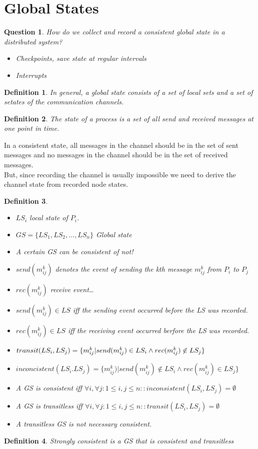 \documentclass[a4paper]{article}
\newtheorem{definition}{Definition}
\newtheorem{question}{Question}
\begin{document}
\section{Global States}
\begin{question}How do we collect and record a consistent global state in a distributed
system?\\
\begin{itemize}
	\item Checkpoints, save state at regular intervals
	\item Interrupts
\end{itemize}
\end{question}
\begin{definition}
	In general, a global state consists of a set of local sets and a set of
	setates of the communication channels.
\end{definition}
\begin{definition}
	The state of a process is a set of all send and received messages at one
	point in time.
\end{definition}
In a consistent state, all messages in the channel should be in the set of sent
messages and no messages in the channel should be in the set of received
messages.\\
But, since recording the channel is usually impossible we need to derive the
channel state from recorded node states.\\
\begin{definition}
	\begin{itemize}
		\item $LS_i$ local state of $P_i$. 
		\item $GS = \{LS_1,LS_2,\dots,LS_n\}$ Global state
		\item A certain GS can be consistent of not!
		\item $send(m^k_{ij})$ denotes the event of sending the kth message
			$m^k_{ij}$ from $P_i$ to $P_j$
		\item $rec(m^k_{ij})$ receive event\dots
		\item $send(m^k_{ij}) \in LS$ iff the sending event occurred
			before the LS was recorded.
		\item $rec(m^k_{ij}) \in LS$ iff the receiving event occurred
			berfore the LS was recorded.
		\item $transit(LS_i,LS_j)=\{m^k_{ij}|send(m^k_{ij}) \in LS_i
			\land rec(m^k_{ij}) \centernot \in LS_j \}$
		\item $inconcistent(LS_i.LS_j)=\{m^k_{ij})|send(m^k_{ij}) \notin
			LS_i \land rec(m^k_{ij}) \in LS_j\}$
		\item A GS is consistent iff $\forall i,\forall j:1\leq i,j
			\leq n : : inconsistent(LS_i, LS_j) = \emptyset$
		\item A GS is transitless iff $\forall i,\forall j:1\leq i,j
			\leq n : : transit(LS_i, LS_j) = \emptyset$
		\item A transitless GS is not necessary consistent.
	\end{itemize}
\end{definition}
\begin{definition}
	Strongly consistent is a GS that is consistent and transitless
\end{definition}
\end{document}
